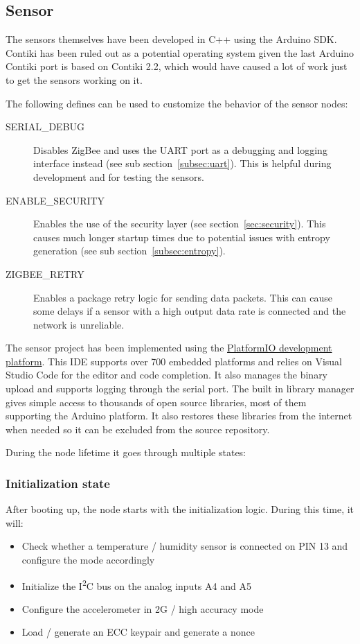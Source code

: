 \documentclass[a4paper,11pt]{scrartcl}
\begin{document}
\subsection{Sensor}
The sensors themselves have been developed in C++ using the Arduino SDK. Contiki has been ruled out as a potential operating system given the last Arduino Contiki port is based on Contiki 2.2, which would have caused a lot of work just to get the sensors working on it.

The following defines can be used to customize the behavior of the sensor nodes:

\begin{description}
\item[SERIAL\_DEBUG] Disables ZigBee and uses the UART port as a debugging and logging interface instead (see sub section~\ref{subsec:uart}). This is helpful during development and for testing the sensors.
\item[ENABLE\_SECURITY] Enables the use of the security layer (see section~\ref{sec:security}). This causes much longer startup times due to potential issues with entropy generation (see sub section~\ref{subsec:entropy}).
\item[ZIGBEE\_RETRY] Enables a package retry logic for sending data packets. This can cause some delays if a sensor with a high output data rate is connected and the network is unreliable.
\end{description}

The sensor project has been implemented using the \href{https://platformio.org/}{PlatformIO development platform}. This IDE supports over 700 embedded platforms and relies on Visual Studio Code for the editor and code completion. It also manages the binary upload and supports logging through the serial port. The built in library manager gives simple access to thousands of open source libraries, most of them supporting the Arduino platform. It also restores these libraries from the internet when needed so it can be excluded from the source repository.

During the node lifetime it goes through multiple states:

\subsubsection*{Initialization state}
After booting up, the node starts with the initialization logic. During this time, it will:

\begin{itemize}
\item Check whether a temperature / humidity sensor is connected on PIN 13 and configure the mode accordingly
\item Initialize the I\textsuperscript{2}C bus on the analog inputs A4 and A5
\item Configure the accelerometer in 2G / high accuracy mode
\item Load / generate an ECC keypair and generate a nonce
\end{itemize}
\end{document}
